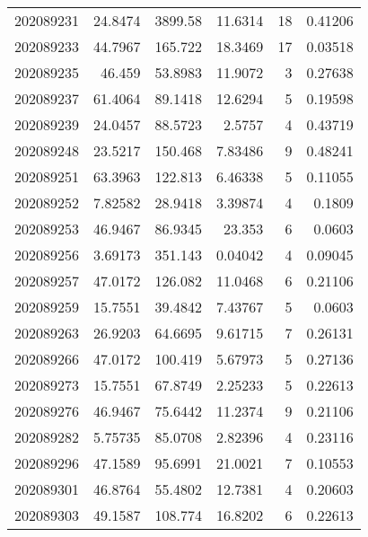 \begin{tabular}{rrrrrr}
 202089231 &         24.8474  &     3899.58   &           11.6314  &          18 & 0.41206 \\
 202089233 &         44.7967  &      165.722  &           18.3469  &          17 & 0.03518 \\
 202089235 &         46.459   &       53.8983 &           11.9072  &           3 & 0.27638 \\
 202089237 &         61.4064  &       89.1418 &           12.6294  &           5 & 0.19598 \\
 202089239 &         24.0457  &       88.5723 &            2.5757  &           4 & 0.43719 \\
 202089248 &         23.5217  &      150.468  &            7.83486 &           9 & 0.48241 \\
 202089251 &         63.3963  &      122.813  &            6.46338 &           5 & 0.11055 \\
 202089252 &          7.82582 &       28.9418 &            3.39874 &           4 & 0.1809  \\
 202089253 &         46.9467  &       86.9345 &           23.353   &           6 & 0.0603  \\
 202089256 &          3.69173 &      351.143  &            0.04042 &           4 & 0.09045 \\
 202089257 &         47.0172  &      126.082  &           11.0468  &           6 & 0.21106 \\
 202089259 &         15.7551  &       39.4842 &            7.43767 &           5 & 0.0603  \\
 202089263 &         26.9203  &       64.6695 &            9.61715 &           7 & 0.26131 \\
 202089266 &         47.0172  &      100.419  &            5.67973 &           5 & 0.27136 \\
 202089273 &         15.7551  &       67.8749 &            2.25233 &           5 & 0.22613 \\
 202089276 &         46.9467  &       75.6442 &           11.2374  &           9 & 0.21106 \\
 202089282 &          5.75735 &       85.0708 &            2.82396 &           4 & 0.23116 \\
 202089296 &         47.1589  &       95.6991 &           21.0021  &           7 & 0.10553 \\
 202089301 &         46.8764  &       55.4802 &           12.7381  &           4 & 0.20603 \\
 202089303 &         49.1587  &      108.774  &           16.8202  &           6 & 0.22613 \\

\end{tabular}
